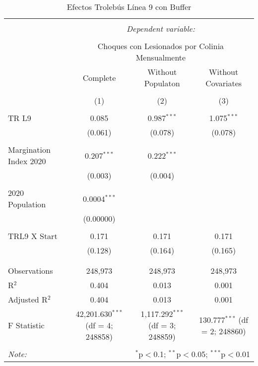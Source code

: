 
\begin{table}[!htbp] \centering 
  \caption{Efectos Trolebús Línea 9 con Buffer} 
  \label{} 
\begin{tabular}{@{\extracolsep{5pt}}lccc} 
\\[-1.8ex]\hline 
\hline \\[-1.8ex] 
 & \multicolumn{3}{c}{\textit{Dependent variable:}} \\ 
\cline{2-4} 
\\[-1.8ex] & \multicolumn{3}{c}{Choques con Lesionados por Colinia Mensualmente} \\ 
 & Complete & Without Populaton & Without Covariates \\ 
\\[-1.8ex] & (1) & (2) & (3)\\ 
\hline \\[-1.8ex] 
 TR L9 & 0.085 & 0.987$^{***}$ & 1.075$^{***}$ \\ 
  & (0.061) & (0.078) & (0.078) \\ 
  & & & \\ 
 Margination Index 2020 & 0.207$^{***}$ & 0.222$^{***}$ &  \\ 
  & (0.003) & (0.004) &  \\ 
  & & & \\ 
 2020 Population & 0.0004$^{***}$ &  &  \\ 
  & (0.00000) &  &  \\ 
  & & & \\ 
 TRL9 X Start & 0.171 & 0.171 & 0.171 \\ 
  & (0.128) & (0.164) & (0.165) \\ 
  & & & \\ 
\hline \\[-1.8ex] 
Observations & 248,973 & 248,973 & 248,973 \\ 
R$^{2}$ & 0.404 & 0.013 & 0.001 \\ 
Adjusted R$^{2}$ & 0.404 & 0.013 & 0.001 \\ 
F Statistic & 42,201.630$^{***}$ (df = 4; 248858) & 1,117.292$^{***}$ (df = 3; 248859) & 130.777$^{***}$ (df = 2; 248860) \\ 
\hline 
\hline \\[-1.8ex] 
\textit{Note:}  & \multicolumn{3}{r}{$^{*}$p$<$0.1; $^{**}$p$<$0.05; $^{***}$p$<$0.01} \\ 
\end{tabular} 
\end{table} 
